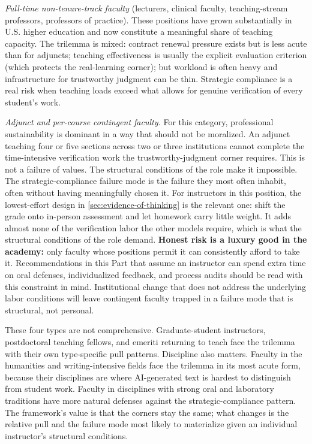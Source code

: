 \documentclass{SIAMbook2023}
\begin{document}
\textit{Full-time non-tenure-track faculty} (lecturers, clinical faculty, teaching-stream professors, professors of practice). These positions have grown substantially in U.S. higher education and now constitute a meaningful share of teaching capacity. The trilemma is mixed: contract renewal pressure exists but is less acute than for adjuncts; teaching effectiveness is usually the explicit evaluation criterion (which protects the real-learning corner); but workload is often heavy and infrastructure for trustworthy judgment can be thin. Strategic compliance is a real risk when teaching loads exceed what allows for genuine verification of every student's work.

\textit{Adjunct and per-course contingent faculty.} For this category, professional sustainability is dominant in a way that should not be moralized. An adjunct teaching four or five sections across two or three institutions cannot complete the time-intensive verification work the trustworthy-judgment corner requires. This is not a failure of values. The structural conditions of the role make it impossible. The strategic-compliance failure mode is the failure they most often inhabit, often without having meaningfully chosen it. For instructors in this position, the lowest-effort design in \cref{sec:evidence-of-thinking} is the relevant one: shift the grade onto in-person assessment and let homework carry little weight. It adds almost none of the verification labor the other models require, which is what the structural conditions of the role demand. \textbf{Honest risk is a luxury good in the academy:} only faculty whose positions permit it can consistently afford to take it. Recommendations in this Part that assume an instructor can spend extra time on oral defenses, individualized feedback, and process audits should be read with this constraint in mind. Institutional change that does not address the underlying labor conditions will leave contingent faculty trapped in a failure mode that is structural, not personal.

These four types are not comprehensive. Graduate-student instructors, postdoctoral teaching fellows, and emeriti returning to teach face the trilemma with their own type-specific pull patterns. Discipline also matters. Faculty in the humanities and writing-intensive fields face the trilemma in its most acute form, because their disciplines are where AI-generated text is hardest to distinguish from student work. Faculty in disciplines with strong oral and laboratory traditions have more natural defenses against the strategic-compliance pattern. The framework's value is that the corners stay the same; what changes is the relative pull and the failure mode most likely to materialize given an individual instructor's structural conditions.
\end{document}
